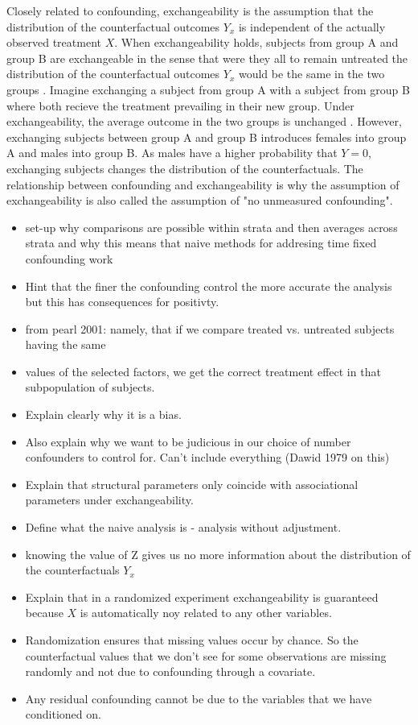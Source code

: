 \documentclass[11pt]{article}
\providecommand{\tightlist}{%
      \setlength{\itemsep}{0pt}\setlength{\parskip}{0pt}}
\begin{document}
Closely related to confounding, exchangeability is the assumption that
the distribution of the counterfactual outcomes \(Y_{x}\) is independent
of the actually observed treatment \(X\). When exchangeability holds,
subjects from group A and group B are exchangeable in the sense that
were they all to remain untreated the distribution of the counterfactual
outcomes \(Y_{x}\) would be the same in the two groups
\citet{Daniel2013}. Imagine exchanging a subject from group A with a
subject from group B where both recieve the treatment prevailing in
their new group. Under exchangeability, the average outcome in the two
groups is unchanged \citet{HernanMA2018}. However, exchanging subjects
between group A and group B introduces females into group A and males
into group B. As males have a higher probability that \(Y = 0\),
exchanging subjects changes the distribution of the counterfactuals. The
relationship between confounding and exchangeability is why the
assumption of exchangeability is also called the assumption of "no
unmeasured confounding". \linebreak

\begin{itemize}
\tightlist
\item
  set-up why comparisons are possible within strata and then averages
  across strata and why this means that naive methods for addresing time
  fixed confounding work
\item
  Hint that the finer the confounding control the more accurate the
  analysis but this has consequences for positivty.
\item
  from pearl 2001: namely, that if we compare treated vs. untreated
  subjects having the same
\item
  values of the selected factors, we get the correct treatment effect in
  that subpopulation of subjects.
\item
  Explain clearly why it is a bias.
\item
  Also explain why we want to be judicious in our choice of number
  confounders to control for. Can't include everything (Dawid 1979 on
  this)
\item
  Explain that structural parameters only coincide with associational
  parameters under exchangeability.
\item
  Define what the naive analysis is - analysis without adjustment.
\item
  knowing the value of Z gives us no more information about the
  distribution of the counterfactuals \(Y_x\)
\item
  Explain that in a randomized experiment exchangeability is guaranteed
  because \(X\) is automatically noy related to any other variables.
\item
  Randomization ensures that missing values occur by chance. So the
  counterfactual values that we don't see for some observations are
  missing randomly and not due to confounding through a covariate.
\item
  Any residual confounding cannot be due to the variables that we have
  conditioned on.
\end{itemize}
\end{document}
